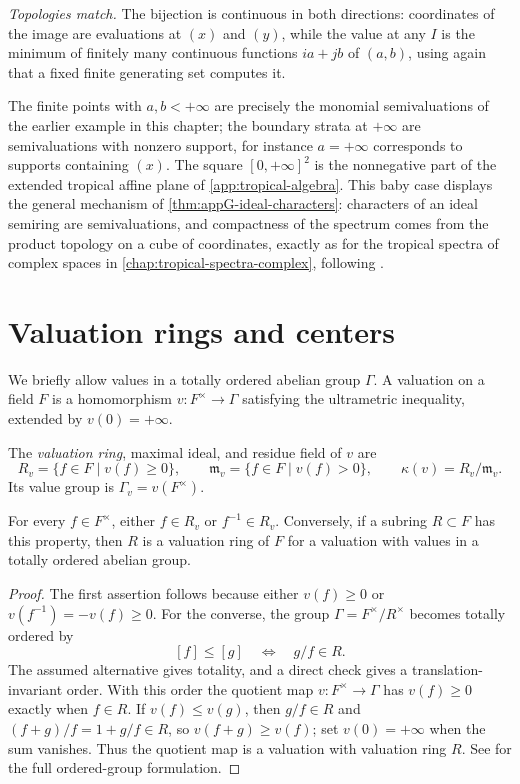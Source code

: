 \begin{example}
\emph{Topologies match.} The bijection is continuous in both directions:
coordinates of the image are evaluations at $(x)$ and $(y)$, while the
value at any $I$ is the minimum of finitely many continuous functions
$ia+jb$ of $(a,b)$, using again that a fixed finite generating set
computes it.

The finite points with $a,b<+\infty$ are precisely the monomial
semivaluations of the earlier example in this chapter; the boundary strata
at $+\infty$ are semivaluations with nonzero support, for instance
$a=+\infty$ corresponds to supports containing $(x)$. The square
$[0,+\infty]^2$ is the nonnegative part of the extended tropical affine
plane of \cref{app:tropical-algebra}. This baby case displays the general
mechanism of \cref{thm:appG-ideal-characters}: characters of an ideal
semiring are semivaluations, and compactness of the spectrum comes from
the product topology on a cube of coordinates, exactly as for the
tropical spectra of complex spaces in
\cref{chap:tropical-spectra-complex}, following \cite{MP24}.
\end{example}

\section{Valuation rings and centers}

We briefly allow values in a totally ordered abelian group $\Gamma$. A
valuation on a field $F$ is a homomorphism
$v:F^\times\to\Gamma$ satisfying the ultrametric inequality, extended by
$v(0)=+\infty$.

\begin{definition}\label{def:valuation-ring-residue-field}
The \emph{valuation ring}, maximal ideal, and residue field of $v$ are
\[
 R_v=\{f\in F\mid v(f)\geq0\},\qquad
 \mathfrak m_v=\{f\in F\mid v(f)>0\},\qquad
 \kappa(v)=R_v/\mathfrak m_v.
\]
Its value group is $\Gamma_v=v(F^\times)$.
\end{definition}

\begin{proposition}\label{prop:valuation-ring-characterization}
For every $f\in F^\times$, either $f\in R_v$ or $f^{-1}\in R_v$. Conversely,
if a subring $R\subset F$ has this property, then $R$ is a valuation ring of
$F$ for a valuation with values in a totally ordered abelian group.
\end{proposition}
\begin{proof}
The first assertion follows because either $v(f)\geq0$ or
$v(f^{-1})=-v(f)\geq0$. For the converse, the group
$\Gamma=F^\times/R^\times$ becomes totally ordered by
\[
       [f]\leq[g]\quad\Longleftrightarrow\quad g/f\in R.
\]
The assumed alternative gives totality, and a direct check gives a
translation-invariant order. With this order the quotient map
$v:F^\times\to\Gamma$ has $v(f)\geq0$ exactly when $f\in R$.
If $v(f)\leq v(g)$, then $g/f\in R$ and
$(f+g)/f=1+g/f\in R$, so $v(f+g)\geq v(f)$; set $v(0)=+\infty$
when the sum vanishes. Thus the quotient map is a valuation with
valuation ring $R$. See \cite[Chapter~VI, \S1]{ZariskiSamuelII} for the full
ordered-group formulation.
\end{proof}

